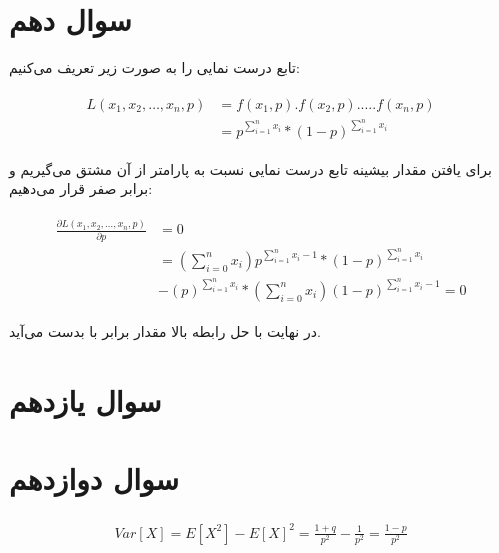 \documentclass[paper=a4, fontsize=11pt]{article}
\numberwithin{equation}{section} %
\numberwithin{figure}{section} %
\numberwithin{table}{section} %
\begin{document}
\section{سوال دهم}
تابع درست نمایی را به صورت زیر تعریف می‌کنیم:

\begin{align}
\begin{split}
    L(x_1, x_2, \ldots, x_n, p) &= f(x_1, p) . f(x_2, p) . \ldots . f(x_n, p)\\
    &= p^{\sum_{i=1}^{n} x_i} * (1-p)^{\sum_{i=1}^{n} x_i}
\end{split}
\end{align}

برای یافتن مقدار بیشینه تابع درست نمایی نسبت به پارامتر 
از آن مشتق می‌گیریم و برابر صفر قرار می‌دهیم:

\begin{align}
\begin{split}
    \frac{\partial L(x_1, x_2, \ldots, x_n, p)}{\partial p} &= 0\\
    &= (\sum_{i=0}^{n} x_i) p^{\sum_{i=1}^{n} x_i - 1} * (1-p)^{\sum_{i=1}^{n} x_i}\\
    &- (p)^{\sum_{i=1}^{n} x_i} * (\sum_{i=0}^{n} x_i) (1-p)^{\sum_{i=1}^{n} x_i - 1} = 0
\end{split}
\end{align}

در نهایت با حل رابطه بالا مقدار  برابر با 
بدست می‌آید.

\section{سوال یازدهم}

\section{سوال دوازدهم}
\begin{align}
\begin{split}
    Var[X] = E[X^2] - E[X]^2 = \frac{1+q}{p^2} - \frac{1}{p^2} = \frac{1-p}{p^2}
\end{split}
\end{align}
\end{document}
